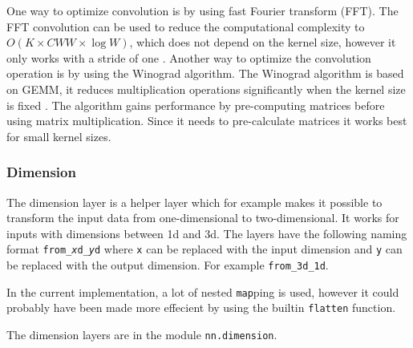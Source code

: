 One way to optimize convolution is by using fast Fourier transform (FFT). The FFT convolution can be used to reduce the computational complexity to $O(K\times CWW \times \log W)$, which does not depend on the kernel size, however it only works with a stride of one \cite{perfomance_analysis_cnn}.
Another way to optimize the convolution operation is by using the Winograd algorithm. The Winograd algorithm is based on GEMM, it reduces multiplication operations significantly when the kernel size is fixed \cite{perfomance_analysis_cnn}. The algorithm gains performance by pre-computing matrices before using matrix multiplication. Since it needs to pre-calculate matrices it works best for small kernel sizes.



\subsubsection{Dimension}%
\label{ssub:impl_dimension}

The dimension layer is a helper layer which for example makes it possible to transform the input data from one-dimensional to two-dimensional.
It works for inputs with dimensions between 1d and 3d. The layers have the following naming format \texttt{from\_\textit{x}d\_\textit{y}d} where \texttt{x} can be replaced with the input dimension and \texttt{y} can be replaced with the output dimension. For example \texttt{from\_3d\_1d}.

In the current implementation, a lot of nested \texttt{map}ping is used, however it could probably have been made more effecient by using the builtin \texttt{flatten} function.

The dimension layers are in the module \texttt{nn.dimension}.

